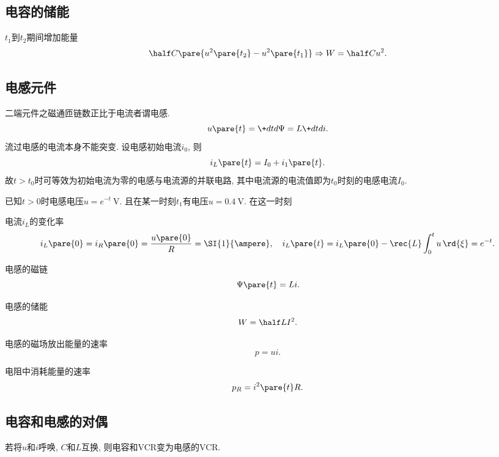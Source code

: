 \documentclass{ctexart}
\begin{document}
\subsection{电容的储能} %
\label{sub:电容的储能}

$t_1$到$t_2$期间增加能量
\[ \half C\pare{u^2\pare{t_2} - u^2\pare{t_1}}\Rightarrow W = \half Cu^2. \]


\subsection{电感元件} %
\label{sub:电感元件}

二端元件之磁通匝链数正比于电流者谓电感.
\[ u\pare{t} = \+dtd\Psi = L\+dtdi. \]
流过电感的电流本身不能突变. 设电感初始电流$i_0$, 则
\[ i_L\pare{t} = I_0 + i_1\pare{t}. \]
故$t>t_0$时可等效为初始电流为零的电感与电流源的并联电路, 其中电流源的电流值即为$t_0$时刻的电感电流$I_0$.

\begin{sample}
    \begin{ex}
        已知$t>0$时电感电压$u=e^{-t}\SI{}{\volt}$. 且在某一时刻$t_1$有电压$u=\SI{0.4}{\volt}$. 在这一时刻
        \begin{cenum}
            \item 电流$i_L$的变化率
            \[ i_L\pare{0} = i_R\pare{0} = \frac{u\pare{0}}{R} = \SI{1}{\ampere},\quad i_L\pare{t} = i_L\pare{0} - \rec{L}\int_0^t u\,\rd{\xi} = e^{-t}. \]
            \item 电感的磁链
            \[ \Psi\pare{t} = Li. \]
            \item 电感的储能
            \[ W = \half LI^2. \]
            \item 电感的磁场放出能量的速率
            \[ p = ui. \]
            \item 电阻中消耗能量的速率
            \[ p_R = i^2\pare{t}R. \]
        \end{cenum}
    \end{ex}
\end{sample}


\subsection{电容和电感的对偶} %
\label{sub:电容和电感的对偶}

若将$u$和$i$呼唤, $C$和$L$互换, 则电容和VCR变为电感的VCR.
\end{document}
